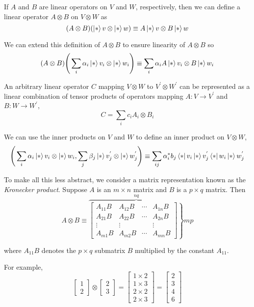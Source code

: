 If $A$ and $B$ are linear operators on $V$ and $W$, respectively, then we can define a linear operator $A \otimes B$ on $V \otimes W$ as 
$$(A \otimes B)(\ket*{v} \otimes \ket*{w}) \equiv A\ket*{v} \otimes B\ket*{w}$$

We can extend this definition of $A \otimes B$ to ensure linearity of $A \otimes B$ so 
$$(A \otimes B) \Bigg( \sum_{i} \alpha_{i} \ket*{v_{i}} \otimes \ket*{w_{i}} \Bigg) \equiv \sum_{i} \alpha_{i} A \ket*{v_{i}} \otimes B \ket*{w_{i}}$$

An arbitrary linear operator $C$ mapping $V \otimes W$ to $V^{'} \otimes W^{'}$ can be represented as a linear combination of tensor products of operators mapping $A: V \rightarrow V^{'}$ and $B: W \rightarrow W^{'}$, 
$$C = \sum_{i} c_{i} A_{i} \otimes B_{i}$$

We can use the inner products on $V$ and $W$ to define an inner product on $V \otimes W$, 
$$\Bigg( \sum_{i} \alpha_{i} \ket*{v_{i}} \otimes \ket*{w_{i}} , \sum_{j} \beta_{j} \ket*{v_{j}^{'}} \otimes \ket*{w_{j}^{'}} \Bigg) \equiv \sum_{ij} \alpha_{i}^{*} b_{j} \bra*{v_{i}}\ket*{v_{j}^{'}} \bra*{w_{i}}\ket*{w_{j}^{'}}$$

To make all this less abstract, we consider a matrix representation known as the \textit{Kronecker product}. Suppose $A$ is an $m \times n$ matrix and $B$ is a $p \times q$ matrix. Then 
$$A \otimes B \equiv \overbrace{\left.\begin{bmatrix}
A_{11}B & A_{12}B & \cdots & A_{1n}B \\ 
A_{21}B & A_{22}B & \cdots & A_{2n}B \\
\vdots & \vdots & & \vdots \\ 
A_{m1}B & A_{m2}B & \cdots & A_{mn}B
\end{bmatrix} \right\}}^{nq} mp
$$

where $A_{11}B$ denotes the $p \times q$ submatrix $B$ multiplied by the constant $A_{11}$. 

For example, 
$$\begin{bmatrix}
1 \\ 2
\end{bmatrix} \otimes \begin{bmatrix}
2 \\ 3
\end{bmatrix} = \begin{bmatrix}
1 \times 2 \\
1 \times 3 \\
2 \times 2 \\
2 \times 3
\end{bmatrix} = \begin{bmatrix}
2 \\ 
3 \\ 
4 \\ 
6
\end{bmatrix}$$

